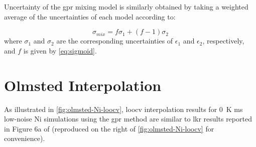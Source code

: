 \documentclass[preprint,12pt]{elsarticle}
\begin{document}
Uncertainty of the \gls{gpr} mixing model is similarly obtained by taking a weighted average of the uncertainties of each model according to:

\begin{equation}
    \sigma_{mix} = f \sigma_1+(f-1) \sigma_2
    \label{eq:gprmix-sigma}
\end{equation}
where $\sigma_1$ and $\sigma_2$ are the corresponding uncertainties of $\epsilon_1$ and $\epsilon_2$, respectively, and $f$ is given by \cref{eq:sigmoid}. 

\section{Olmsted Interpolation}

As illustrated in \cref{fig:olmsted-Ni-loocv}, \gls{loocv} interpolation results for \SI{0}{\kelvin} \gls{ms} low-noise Ni simulations using the \gls{gpr} method are similar to \gls{lkr} results reported in Figure 6a of \citet{chesserLearningGrainBoundary2020} (reproduced on the right of \cref{fig:olmsted-Ni-loocv} for convenience).
\end{document}
